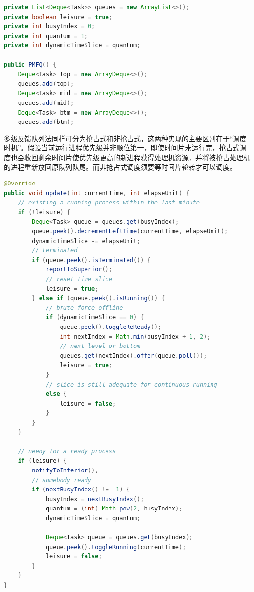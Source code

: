 \documentclass[12pt, a4paper, UTF8]{ctexart}
\begin{document}
\begin{lstlisting}[language={java},caption={多级反馈队列（数据结构）}]
private List<Deque<Task>> queues = new ArrayList<>();
private boolean leisure = true;
private int busyIndex = 0;
private int quantum = 1;
private int dynamicTimeSlice = quantum;

public PMFQ() {
    Deque<Task> top = new ArrayDeque<>();
    queues.add(top);
    Deque<Task> mid = new ArrayDeque<>();
    queues.add(mid);
    Deque<Task> btm = new ArrayDeque<>();
    queues.add(btm);
\end{lstlisting}

多级反馈队列法同样可分为抢占式和非抢占式，这两种实现的主要区别在于“调度时机”。假设当前运行进程优先级并非顺位第一，即使时间片未运行完，抢占式调度也会收回剩余时间片使优先级更高的新进程获得处理机资源，并将被抢占处理机的进程重新放回原队列队尾。而非抢占式调度须要等时间片轮转才可以调度。
\begin{lstlisting}[language={java},caption={多级反馈队列（非抢占式调度）}]
@Override
public void update(int currentTime, int elapseUnit) {
    // existing a running process within the last minute
    if (!leisure) {
        Deque<Task> queue = queues.get(busyIndex);
        queue.peek().decrementLeftTime(currentTime, elapseUnit);
        dynamicTimeSlice -= elapseUnit;
        // terminated
        if (queue.peek().isTerminated()) {
            reportToSuperior();
            // reset time slice
            leisure = true;
        } else if (queue.peek().isRunning()) {
            // brute-force offline
            if (dynamicTimeSlice == 0) {
                queue.peek().toggleReReady();
                int nextIndex = Math.min(busyIndex + 1, 2);
                // next level or bottom
                queues.get(nextIndex).offer(queue.poll());
                leisure = true;
            }
            // slice is still adequate for continuous running
            else {
                leisure = false;
            }
        }
    }

    // needy for a ready process
    if (leisure) {
        notifyToInferior();
        // somebody ready
        if (nextBusyIndex() != -1) {
            busyIndex = nextBusyIndex();
            quantum = (int) Math.pow(2, busyIndex);
            dynamicTimeSlice = quantum;

            Deque<Task> queue = queues.get(busyIndex);
            queue.peek().toggleRunning(currentTime);
            leisure = false;
        }
    }
}
\end{lstlisting}
\end{document}
